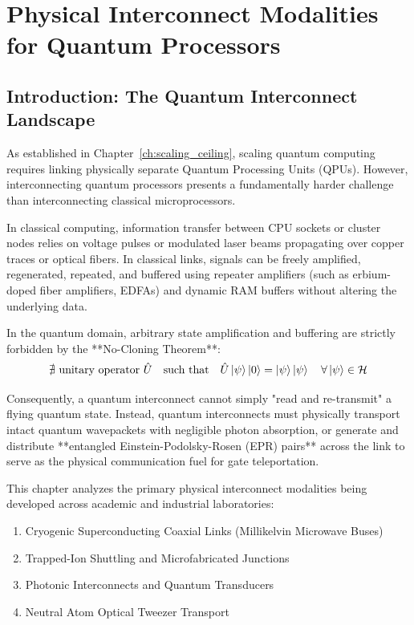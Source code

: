 \chapter{Physical Interconnect Modalities for Quantum Processors}
\label{ch:hardware_interconnects}

\section{Introduction: The Quantum Interconnect Landscape}
As established in Chapter~\ref{ch:scaling_ceiling}, scaling quantum computing requires linking physically separate Quantum Processing Units (QPUs). However, interconnecting quantum processors presents a fundamentally harder challenge than interconnecting classical microprocessors.

In classical computing, information transfer between CPU sockets or cluster nodes relies on voltage pulses or modulated laser beams propagating over copper traces or optical fibers. In classical links, signals can be freely amplified, regenerated, repeated, and buffered using repeater amplifiers (such as erbium-doped fiber amplifiers, EDFAs) and dynamic RAM buffers without altering the underlying data.

In the quantum domain, arbitrary state amplification and buffering are strictly forbidden by the **No-Cloning Theorem**:
\begin{equation}
    \nexists \text{ unitary operator } \hat{U} \quad \text{such that} \quad \hat{U} \ket{\psi}\ket{0} = \ket{\psi}\ket{\psi} \quad \forall \ket{\psi} \in \mathcal{H}
\end{equation}

Consequently, a quantum interconnect cannot simply "read and re-transmit" a flying quantum state. Instead, quantum interconnects must physically transport intact quantum wavepackets with negligible photon absorption, or generate and distribute **entangled Einstein-Podolsky-Rosen (EPR) pairs** across the link to serve as the physical communication fuel for gate teleportation.

This chapter analyzes the primary physical interconnect modalities being developed across academic and industrial laboratories:
\begin{enumerate}
    \item Cryogenic Superconducting Coaxial Links (Millikelvin Microwave Buses)
    \item Trapped-Ion Shuttling and Microfabricated Junctions
    \item Photonic Interconnects and Quantum Transducers
    \item Neutral Atom Optical Tweezer Transport
\end{enumerate}

